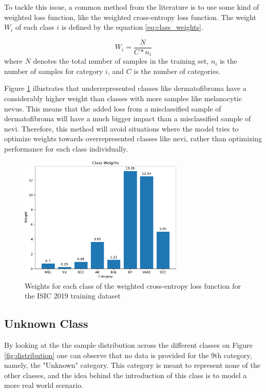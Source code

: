     To tackle this issue, a common method from the literature \cite{?} is to use some kind of weighted loss function, like the weighted cross-entropy loss function. The weight $W_i$ of each class $i$ is defined by the equation \ref{eq:class_weights}. \par

    \begin{equation}
        W_i=\frac{N}{C*n_i}
        \label{eq:class_weights}
    \end{equation}
    where $N$ denotes the total number of samples in the training set, $n_i$ is the number of samples for category $i$, and $C$ is the number of categories. \par

    Figure \ref{fig:weight_distribution} illustrates that underrepresented classes like dermatofibroma have a considerably higher weight than classes with more samples like melanocytic nevus. This means that the added loss from a misclassified sample of  dermatofibroma will have a much bigger impact than a misclassified sample of nevi. Therefore, this method will avoid situations where the model tries to optimize weights towards overrepresented classes like nevi, rather than optimizing performance for each class individually. \par

    \begin{figure}[h!]
    \centering
      \includegraphics[width=0.7\textwidth,keepaspectratio]{figs/weight_distribution.pdf}
      \caption{Weights for each class of the weighted cross-entropy loss function for the ISIC 2019 training dataset}
      \label{fig:weight_distribution}
    \end{figure}

\subsection{Unknown Class}
\label{subsection:unknown}
    By looking at the the sample distribution across the different classes on Figure \ref{fig:distribution} one can observe that no data is provided for the 9th category, namely, the "Unknown" category. This category is meant to represent none of the other classes, and the idea behind the introduction of this class is to model a more real world scenario. \par
    

